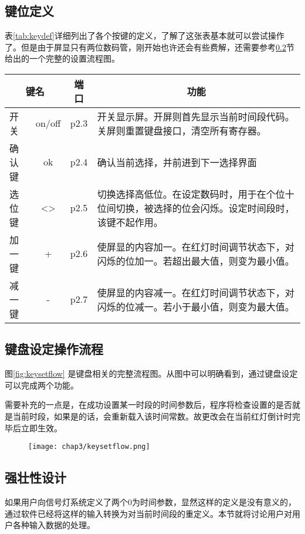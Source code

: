 \subsection{键位定义} \label{sec:keydefination}
		表\ref{tab:keydef}详细列出了各个按键的定义，了解了这张表基本就可以尝试操作了。但是由于屏显只有两位数码管，刚开始也许还会有些费解，还需要参考\ref{sec:keysetflow}节给出的一个完整的设置流程图。
		\begin{table}[!htpb]
      	\centering
      	\begin{tabular}{lcc|p{}} \toprule
        \multicolumn{2}{c}{键名} & 端口 & \multicolumn{1}{c}{功能} \\ \midrule
        开关 &on/off & p2.3 & 开关显示屏。开屏则首先显示当前时间段代码。关屏则重置键盘接口，清空所有寄存器。\\ \hline
        确认键&ok & p2.4 & 确认当前选择，并前进到下一选择界面\\ \hline
        选位键&<> & p2.5 &切换选择高低位。在设定数码时，用于在个位十位间切换，被选择的位会闪烁。设定时间段时，该键不起作用。\\ \hline
        加一键& + & p2.6 &使屏显的内容加一。在红灯时间调节状态下，对闪烁的位加一。若超出最大值，则变为最小值。\\ \hline
        减一键& -  & p2.7 &使屏显的内容减一。在红灯时间调节状态下，对闪烁的位减一。若小于最小值，则变为最大值。\\ 
				 \bottomrule
      	\end{tabular}
		\end{table}
\subsection{键盘设定操作流程}  \label{sec:keysetflow}
图\ref{fig:keysetflow} 是键盘相关的完整流程图。从图中可以明确看到，通过键盘设定可以完成两个功能。

需要补充的一点是，在成功设置某一时段的时间参数后，程序将检查设置的是否就是当前时段，如果是的话，会重新载入该时间常数。故更改会在当前红灯倒计时完毕后立即生效。
\begin{figure}[!tbhp]
      \centering
      \texttt{[image: chap3/keysetflow.png]}
    \end{figure}
\subsection{强壮性设计}
如果用户向信号灯系统定义了两个0为时间参数，显然这样的定义是没有意义的，通过软件已经将这样的输入转换为对当前时间段的重定义。本节就将讨论用户对用户各种输入数据的处理。

